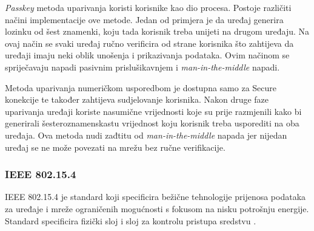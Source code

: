 \documentclass[times, utf8, diplomski]{fer}
\begin{document}
\emph{Passkey} metoda uparivanja koristi korisnike kao dio procesa. Postoje različiti načini implementacije ove metode. Jedan od primjera je da uređaj generira lozinku od šest znamenki, koju tada korisnik treba unijeti na drugom uređaju. Na ovaj način se svaki uređaj ručno verificira od strane korisnika što zahtijeva da uređaji imaju neki oblik unošenja i prikazivanja podataka. Ovim načinom se spriječavaju napadi pasivnim prislušikavnjem i \emph{man-in-the-middle} napadi.

Metoda uparivanja numeričkom usporedbom je dostupna samo za Secure konekcije te također zahtijeva sudjelovanje korisnika. Nakon druge faze uparivanja uređaji koriste nasumične vrijednosti koje su prije razmjenili kako bi generirali šesteroznamenskastu vrijednost koju korisnik treba usporediti na oba uređaja. Ova metoda nudi zađtitu od \emph{man-in-the-middle} napada jer nijedan uređaj se ne može povezati na mrežu bez ručne verifikacije\citep{Kacherovska2019Aug}.

\subsubsection{IEEE 802.15.4}
IEEE 802.15.4 je standard koji specificira bežične tehnologije prijenosa podataka za uređaje i mreže ograničenih mogućnosti s fokusom na nisku potrošnju energije. Standard specificira fizički sloj i sloj za kontrolu pristupa sredstvu . 
\end{document}
